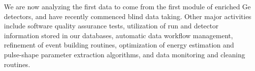 %
%
%
%
%
%
%
%
%
%
%

We are now analyzing the first data to come from the first module of enriched Ge detectors, and have recently commenced blind data taking. Other major activities include software quality assurance tests, utilization of run and detector information stored in our databases, automatic data workflow management, refinement of event building routines, optimization of energy estimation and pulse-shape parameter extraction algorithms, and data monitoring and cleaning routines.
